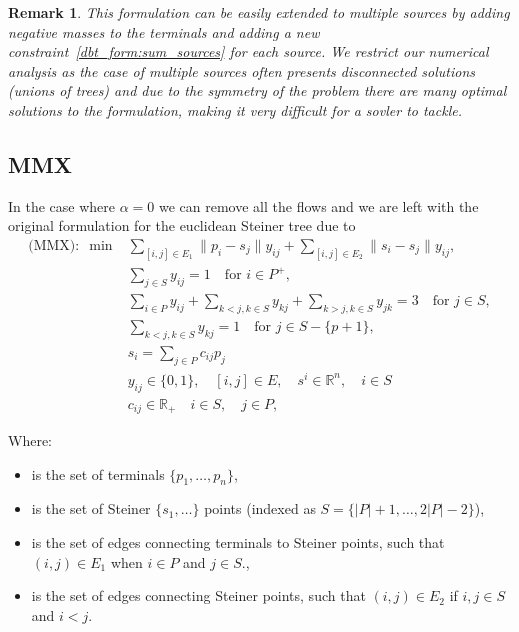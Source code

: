 \documentclass[11pt,reqno,a4paper]{amsart}
\newenvironment{itemizeb}
{\begin{itemize}
     \itemsep=2pt}{
\end{itemize}}
\numberwithin{equation}{section}
\theoremstyle{mytheorem}
\theoremstyle{myremark}
\newtheorem{remark}[subsection]{Remark}
\theoremstyle{myparagraph}
\newcommand{\R}{\mathbb{R}}
\begin{document}
    \begin{remark}
        This formulation can be easily extended to multiple sources by adding negative masses to the terminals and adding a new
        constraint~\ref{dbt_form:sum_sources} for each source.
        We restrict our numerical analysis as the case of multiple sources often presents disconnected solutions (unions of trees)
        and due to the symmetry of the problem there are many optimal solutions to the formulation, making it very difficult for a sovler to
        tackle.
    \end{remark}

    \subsection{MMX}
    In the case where $\alpha=0$ we can remove all the flows and we are left with the original formulation for the euclidean
    Steiner tree due to~\cite[Section 2]{mmx}
    \begin{align}
        \text{(MMX)}: \; \min &\sum_{[i,j] \in E_1} \|p_i - s_j\| y_{ij} + \sum_{[i,j] \in E_2} \|s_i - s_j\| y_{ij}, \\
        & \sum_{j \in S} y_{ij} = 1 \quad \text{for } i \in P^+, \\
        & \sum_{i \in P} y_{ij} + \sum_{k < j, k \in S} y_{kj} + \sum_{k > j, k \in S} y_{jk} = 3 \quad \text{for } j \in S, \label{MMX:connectivity_steiner} \\
        & \sum_{k < j, k \in S} y_{kj} = 1 \quad \text{for } j \in S - \{p+1\},  \\
        & s_i = \sum_{j \in P} c_{ij} p_j \\
        & y_{ij} \in \{0, 1\}, \quad [i, j] \in E, \quad s^i \in \mathbb{R}^n, \quad i \in S \\
        & c_{ij} \in \R_+ \quad i \in S, \quad j \in P,
    \end{align}

    Where:
    \begin{itemizeb}
         cm=.3 cm
        \item [$P$] is the set of terminals $\{p_1, \ldots, p_n\}$,
        \item [$S$] is the set of Steiner $\{s_1, \ldots\}$ points (indexed as $S = \{|P| + 1, \dots, 2|P|-2\}$),
        \item [$E_1$] is the set of edges connecting terminals to Steiner points, such that $(i,j) \in E_1$ when $i \in P$ and $j \in S$.,
        \item [$E_2$] is the set of edges connecting Steiner points, such that $(i,j) \in E_2$ if $i,j \in S$ and $i < j$.
    \end{itemizeb}
\end{document}

